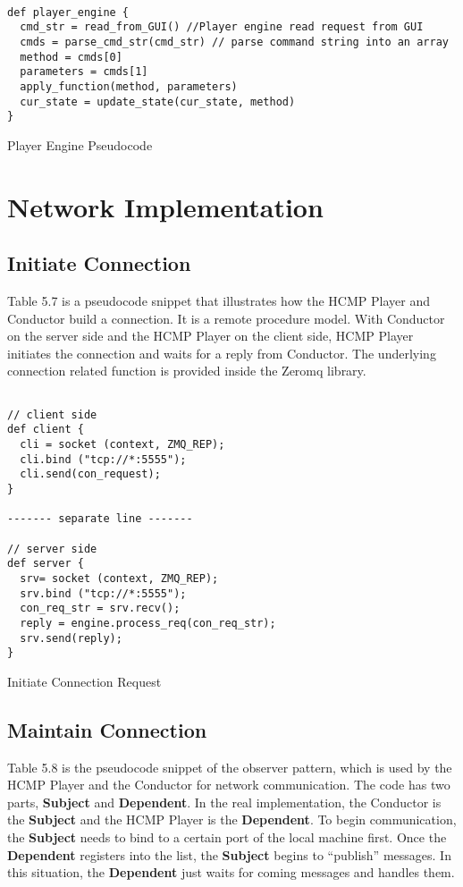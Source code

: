 \begin{table}[htdp]
\centering
\begin{lstlisting}

def player_engine {
  cmd_str = read_from_GUI() //Player engine read request from GUI 
  cmds = parse_cmd_str(cmd_str) // parse command string into an array
  method = cmds[0]
  parameters = cmds[1]
  apply_function(method, parameters)
  cur_state = update_state(cur_state, method)
}

\end{lstlisting}
\caption[Player Engine Pseudocode]{Player Engine Pseudocode}
\end{table}

\section{Network Implementation}

\subsection{Initiate Connection}
Table 5.7 is a pseudocode snippet that illustrates how the HCMP Player and   
Conductor build a connection. It is a remote procedure model.
With Conductor on the server side and the HCMP Player on the client side, HCMP 
Player initiates the connection and waits for a reply from Conductor. The 
underlying connection related function is provided inside the Zeromq library.

\begin{table}[htdp]
\centering
\begin{lstlisting}

// client side
def client {
  cli = socket (context, ZMQ_REP);
  cli.bind ("tcp://*:5555");
  cli.send(con_request);
}

------- separate line -------

// server side
def server {
  srv= socket (context, ZMQ_REP);
  srv.bind ("tcp://*:5555");
  con_req_str = srv.recv();
  reply = engine.process_req(con_req_str);
  srv.send(reply);
}

\end{lstlisting}
\caption[Initiate Connection Request]{Initiate Connection Request}
\end{table}

\subsection{Maintain Connection}  
Table 5.8 is the pseudocode snippet of the observer pattern, 
which is used by the HCMP Player and the Conductor for network
communication. The code has two parts, {\bf Subject} and {\bf Dependent}. In 
the real implementation, the Conductor is the {\bf Subject} and the HCMP Player 
is the {\bf Dependent}. To begin communication, the {\bf Subject} needs to 
bind to a certain port of the local machine first. 
Once the {\bf Dependent} registers into the list, the {\bf Subject} begins 
to ``publish'' messages. In this situation, the {\bf Dependent} just waits 
for coming messages and handles them.

